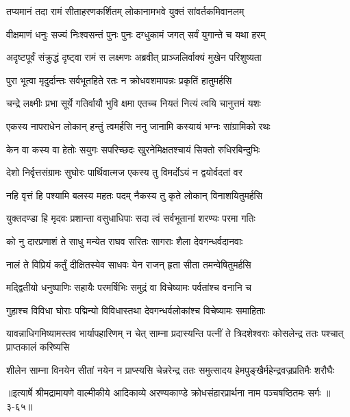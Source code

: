 
\twolineshloka
{तप्यमानं तदा रामं सीताहरणकर्शितम्}
{लोकानामभवे युक्तं सांवर्तकमिवानलम्} %

\twolineshloka
{वीक्षमाणं धनुः सज्यं निःश्वसन्तं पुनः पुनः}
{दग्धुकामं जगत् सर्वं युगान्ते च यथा हरम्} %

\twolineshloka
{अदृष्टपूर्वं संक्रुद्धं दृष्ट्वा रामं स लक्ष्मणः}
{अब्रवीत् प्राञ्जलिर्वाक्यं मुखेन परिशुष्यता} %

\twolineshloka
{पुरा भूत्वा मृदुर्दान्तः सर्वभूतहिते रतः}
{न क्रोधवशमापन्नः प्रकृतिं हातुमर्हसि} %

\twolineshloka
{चन्द्रे लक्ष्मीः प्रभा सूर्ये गतिर्वायौ भुवि क्षमा}
{एतच्च नियतं नित्यं त्वयि चानुत्तमं यशः} %

\twolineshloka
{एकस्य नापराधेन लोकान् हन्तुं त्वमर्हसि}
{ननु जानामि कस्यायं भग्नः सांग्रामिको रथः} %

\twolineshloka
{केन वा कस्य वा हेतोः सयुगः सपरिच्छदः}
{खुरनेमिक्षतश्चायं सिक्तो रुधिरबिन्दुभिः} %

\twolineshloka
{देशो निर्वृत्तसंग्रामः सुघोरः पार्थिवात्मज}
{एकस्य तु विमर्दोऽयं न द्वयोर्वदतां वर} %

\twolineshloka
{नहि वृत्तं हि पश्यामि बलस्य महतः पदम्}
{नैकस्य तु कृते लोकान् विनाशयितुमर्हसि} %

\twolineshloka
{युक्तदण्डा हि मृदवः प्रशान्ता वसुधाधिपाः}
{सदा त्वं सर्वभूतानां शरण्यः परमा गतिः} %

\twolineshloka
{को नु दारप्रणाशं ते साधु मन्येत राघव}
{सरितः सागराः शैला देवगन्धर्वदानवाः} %

\twolineshloka
{नालं ते विप्रियं कर्तुं दीक्षितस्येव साधवः}
{येन राजन् हृता सीता तमन्वेषितुमर्हसि} %

\twolineshloka
{मद्द्वितीयो धनुष्पाणिः सहायैः परमर्षिभिः}
{समुद्रं वा विचेष्यामः पर्वतांश्च वनानि च} %

\twolineshloka
{गुहाश्च विविधा घोराः पद्मिन्यो विविधास्तथा}
{देवगन्धर्वलोकांश्च विचेष्यामः समाहिताः} %

\threelineshloka
{यावन्नाधिगमिष्यामस्तव भार्यापहारिणम्}
{न चेत् साम्ना प्रदास्यन्ति पत्नीं ते त्रिदशेश्वराः}
{कोसलेन्द्र ततः पश्चात् प्राप्तकालं करिष्यसि} %

\twolineshloka
{शीलेन साम्ना विनयेन सीतां नयेन न प्राप्स्यसि चेन्नरेन्द्र}
{ततः समुत्सादय हेमपुङ्खैर्महेन्द्रवज्रप्रतिमैः शरौघैः} %


॥इत्यार्षे श्रीमद्रामायणे वाल्मीकीये आदिकाव्ये अरण्यकाण्डे क्रोधसंहारप्रार्थना नाम पञ्चषष्ठितमः सर्गः ॥३-६५॥
